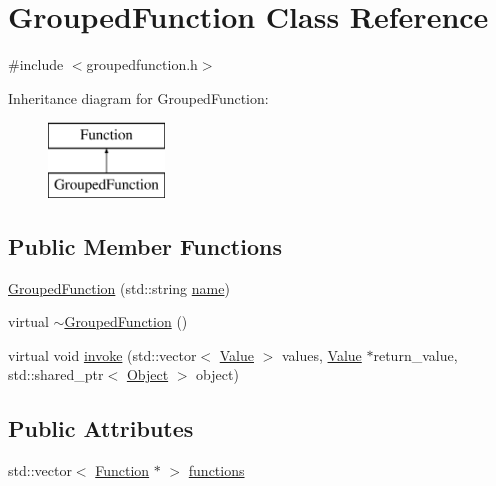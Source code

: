 \hypertarget{classGroupedFunction}{}\section{Grouped\+Function Class Reference}
\label{classGroupedFunction}


{\ttfamily \#include $<$groupedfunction.\+h$>$}

Inheritance diagram for Grouped\+Function\+:\begin{figure}[H]
\begin{center}
\leavevmode
\includegraphics[height=2.000000cm]{classGroupedFunction}
\end{center}
\end{figure}
\subsection*{Public Member Functions}
\begin{DoxyCompactItemize}
\item 
\hyperlink{classGroupedFunction_a5c0b6a884019fdf2eb5caab86e0fec9c}{Grouped\+Function} (std\+::string \hyperlink{classFunction_a161d1ceb4f67f3222caf429fea7b71f1}{name})
\item 
virtual \hyperlink{classGroupedFunction_a5f3c1ed74083a0b9f1dea5ae2f287e70}{$\sim$\+Grouped\+Function} ()
\item 
virtual void \hyperlink{classGroupedFunction_a90a74bd39250863046a7cb97ce013d2b}{invoke} (std\+::vector$<$ \hyperlink{classValue}{Value} $>$ values, \hyperlink{classValue}{Value} $\ast$return\+\_\+value, std\+::shared\+\_\+ptr$<$ \hyperlink{classObject}{Object} $>$ object)
\end{DoxyCompactItemize}
\subsection*{Public Attributes}
\begin{DoxyCompactItemize}
\item 
std\+::vector$<$ \hyperlink{classFunction}{Function} $\ast$ $>$ \hyperlink{classGroupedFunction_a34767023406ae622e9d33d81584e969a}{functions}
\end{DoxyCompactItemize}


